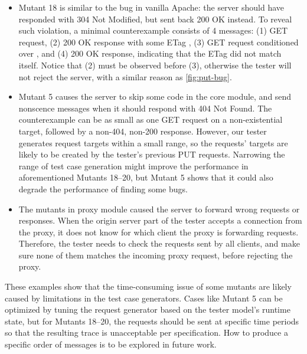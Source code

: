 \begin{itemize}
  \item Mutant 18 is similar to the bug in vanilla Apache: the server should have
    responded with 304 Not Modified, but sent back 200 OK instead.  To reveal
    such violation, a minimal counterexample consists of 4 messages: (1) GET
    request, (2) 200 OK response with some ETag , (3) GET request
    conditioned over , and (4) 200 OK response,
    indicating that the ETag  did not match itself.  Notice that (2) must be
    observed before (3), otherwise the tester will not reject the server, with a
    similar reason as \autoref{fig:put-bug}.

  \item Mutant 5 causes the server to skip some code in the core module, and
    send nonscence messages when it should respond with 404 Not Found.  The
    counterexample can be as small as one GET request on a non-existential
    target, followed by a non-404, non-200 response.  However, our tester
    generates request targets within a small range, so the requests' targets are
    likely to be created by the tester's previous PUT requests.  Narrowing the
    range of test case generation might improve the performance in
    aforementioned Mutants 18--20, but Mutant 5 shows that it could
    also degrade the performance of finding some bugs.

  \item The mutants in proxy module caused the server to forward wrong requests
    or responses.  When the origin server part of the tester accepts a
    connection from the proxy, it does not know for which client the proxy is
    forwarding requests.  Therefore, the tester needs to check the requests sent
    by all clients, and make sure none of them matches the incoming proxy
    request, before rejecting the proxy.
\end{itemize}

These examples show that the time-consuming issue of some mutants are likely
caused by limitations in the test case generators.  Cases like Mutant 5 can be
optimized by tuning the request generator based on the tester model's runtime
state, but for Mutants 18--20, the requests should be sent at
specific time periods so that the resulting trace is unacceptable per
specification.  How to produce a specific order of messages is to be explored in
future work.

